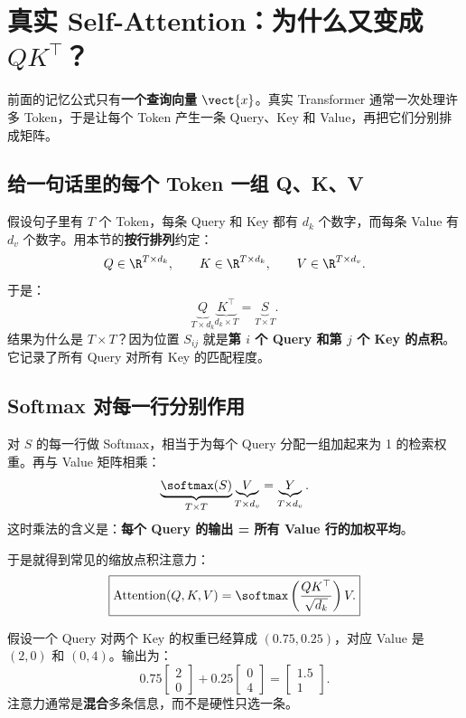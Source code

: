 \section{真实 Self-Attention：为什么又变成 $QK^\top$？}

前面的记忆公式只有\textbf{一个查询向量} $\vect{x}$。真实 Transformer 通常一次处理许多 Token，于是让每个 Token 产生一条 Query、Key 和 Value，再把它们分别排成矩阵。

\subsection{给一句话里的每个 Token 一组 Q、K、V}

假设句子里有 $T$ 个 Token，每条 Query 和 Key 都有 $d_k$ 个数字，而每条 Value 有 $d_v$ 个数字。用本节的\textbf{按行排列}约定：
\[
Q\in\R^{T\times d_k},\qquad
K\in\R^{T\times d_k},\qquad
V\in\R^{T\times d_v}.
\]
于是：
\[
\underbrace{Q}_{T\times d_k}
\underbrace{K^\top}_{d_k\times T}
=
\underbrace{S}_{T\times T}.
\]
结果为什么是 $T\times T$？因为位置 $S_{ij}$ 就是\textbf{第 $i$ 个 Query 和第 $j$ 个 Key 的点积}。它记录了所有 Query 对所有 Key 的匹配程度。

\subsection{Softmax 对每一行分别作用}

对 $S$ 的每一行做 Softmax，相当于为每个 Query 分配一组加起来为 1 的检索权重。再与 Value 矩阵相乘：
\[
\underbrace{\softmax(S)}_{T\times T}
\underbrace{V}_{T\times d_v}
=
\underbrace{Y}_{T\times d_v}.
\]
这时乘法的含义是：\textbf{每个 Query 的输出 = 所有 Value 行的加权平均}。

于是就得到常见的缩放点积注意力：
\begin{equation}
\boxed{\operatorname{Attention}(Q,K,V)
=\softmax\left(\frac{QK^\top}{\sqrt{d_k}}\right)V.}
\end{equation}

\begin{example}[title={不是必须选出单独一条记忆}]
假设一个 Query 对两个 Key 的权重已经算成 $(0.75,0.25)$，对应 Value 是 $(2,0)$ 和 $(0,4)$。输出为：
\[
0.75\begin{bmatrix}2\\0\end{bmatrix}
+0.25\begin{bmatrix}0\\4\end{bmatrix}
=\begin{bmatrix}1.5\\1\end{bmatrix}.
\]
注意力通常是\textbf{混合}多条信息，而不是硬性只选一条。
\end{example}

